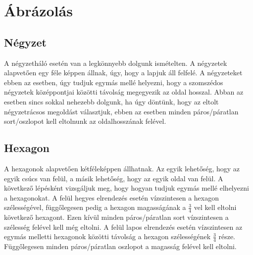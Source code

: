\chapter{Ábrázolás}

\section{Négyzet}

A négyzetháló esetén van a legkönnyebb dolgunk ismételten. A négyzetek alapvetően egy féle képpen állnak, úgy, hogy a lapjuk áll felfelé.  A négyzeteket ebben az esetben, úgy tudjuk egymás mellé helyezni, hogy a szomszédos négyzetek középpontjai közötti távolság megegyezik az oldal hosszal. 
\newline
\newline Abban az esetben sincs sokkal nehezebb dolgunk, ha úgy döntünk, hogy az eltolt négyzetrácsos megoldást választjuk, ebben az esetben minden páros/páratlan sort/oszlopot kell eltolnunk az oldalhosszának felével.

\section{Hexagon}

A hexagonok alapvetően kétféleképpen állhatnak. Az egyik lehetőség, hogy az egyik csúcs van felül, a másik lehetőség, hogy az egyik oldal van felül. 
\newline
\newline A következő lépésként vizsgáljuk meg, hogy hogyan tudjuk egymás mellé elhelyezni a hexagonokat.
\newline
\newline A felül hegyes elrendezés esetén vízszintesen a hexagon szélességével, függőlegesen pedig a hexagon magasságának a $\frac{3}{4}$ vel kell eltolni következő hexagont. Ezen kívül minden páros/páratlan sort vízszintesen a szélesség felével kell még eltolni.
\newline
\newline A felül lapos elrendezés esetén vízszintesen az egymás melletti hexagonok közötti távolság a hexagon szélességének $\frac{3}{4}$ része. Függőlegesen minden páros/páratlan oszlopot a magasság felével kell eltolni.

